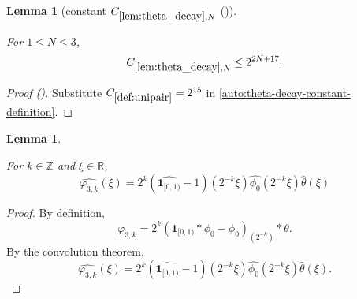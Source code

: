 \documentclass[12pt,reqno]{amsart}
\newcommand{\auto}{{({\tiny\faCar})}}
\theoremstyle{plain}
\newtheorem{lemma}[theorem]{Lemma}
\numberwithin{equation}{section}
\theoremstyle{remark}
\newcommand{\uses}[1]{}
\newcommand{\usesdefs}[1]{}
\newcommand{\leanok}{}
\newcommand{\lean}[1]{}
\begin{document}
\begin{lemma}[constant $C_{\ref{lem:theta_decay},N}$ \auto]\label{constant theta decay}\uses{lem:theta_decay}\usesdefs{def:unipair}
\lean{Auto.constantThetaDecay}
\leanok
For $1\le N\le3$,
\begin{equation}\label{constant theta decay bound}
C_{\ref{lem:theta_decay},N}\le2^{2N+17}.
\end{equation}
\end{lemma}
\begin{proof}[Proof \auto]
Substitute $C_{\ref{def:unipair}}=2^{15}$ in \eqref{auto:theta-decay-constant-definition}.
\end{proof}


\begin{lemma}\label{lem:ft_phi3_eq}\uses{}\usesdefs{defn:window based bump functions}
\lean{Auto.fourierPhiThreeEq}
\leanok
For $k\in\mathbb{Z}$ and $\xi\in\mathbb{R}$,
\begin{equation}\label{auto:varphi-three-Fourier-transform} \widehat{\varphi_{3,k}}(\xi) = 2^k(\widehat{\mathbf{1}_{[0,1)}}-1)(2^{-k}\xi)\widehat{\phi_0}(2^{-k}\xi)\widehat{\theta}(\xi) \end{equation}
\end{lemma}

\begin{proof}
By definition,
\[\varphi_{3,k} = 2^k (\mathbf{1}_{[0,1)} * \phi_0 - \phi_0)_{(2^{-k}) }*\theta.\]
By the convolution theorem,
\[\widehat{\varphi_{3,k}}(\xi) = 2^k(\widehat{\mathbf{1}_{[0,1)}}-1)(2^{-k}\xi)\widehat{\phi_0}(2^{-k}\xi)\widehat{\theta}(\xi).\]
\end{proof}
\end{document}
